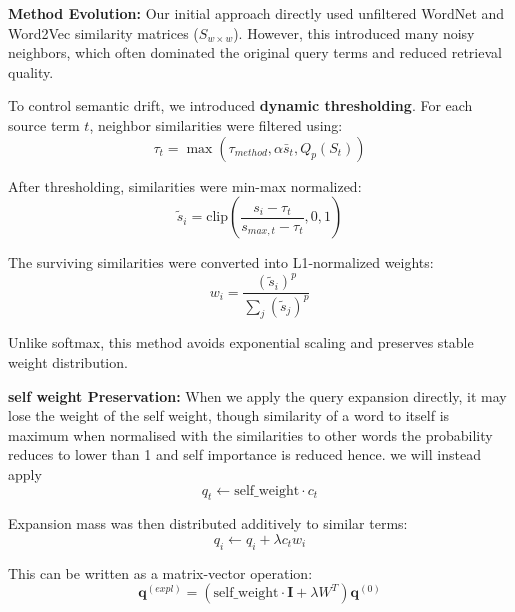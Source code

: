 \documentclass[runningheads]{llncs}
\begin{document}
\textbf{Method Evolution:}  
Our initial approach directly used unfiltered WordNet and Word2Vec similarity matrices ($S_{w \times w}$). However, this introduced many noisy neighbors, which often dominated the original query terms and reduced retrieval quality.

To control semantic drift, we introduced \textbf{dynamic thresholding}. For each source term $t$, neighbor similarities were filtered using:
\begin{equation}
\tau_t = \max\left(\tau_{method}, \alpha \bar{s}_t, Q_p(S_t)\right)
\end{equation}

After thresholding, similarities were min-max normalized:
\begin{equation}
\tilde{s}_i = \text{clip}\left(\frac{s_i - \tau_t}{s_{max,t} - \tau_t}, 0, 1\right)
\end{equation}

The surviving similarities were converted into L1-normalized weights:
\begin{equation}
w_i = \frac{(\tilde{s}_i)^p}{\sum_j (\tilde{s}_j)^p}
\end{equation}

Unlike softmax, this method avoids exponential scaling and preserves stable weight distribution.

\textbf{self weight Preservation:}  
When we apply the query expansion directly, it may lose the weight of the self weight, though similarity of a word to itself is maximum when normalised with the similarities to other words the probability reduces to lower than 1 and self importance is reduced hence. we will instead apply 
\begin{equation}
q_t \leftarrow \text{self\_weight} \cdot c_t
\end{equation}

Expansion mass was then distributed additively to similar terms:
\begin{equation}
q_i \leftarrow q_i + \lambda c_t w_i
\end{equation}

This can be written as a matrix-vector operation:
\begin{equation}
\mathbf{q}^{(expl)} = (\text{self\_weight} \cdot \mathbf{I} + \lambda W^T) \mathbf{q}^{(0)}
\end{equation}
\end{document}

